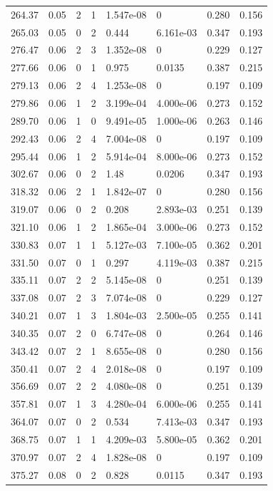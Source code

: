 \documentclass[preview]{standalone}
\begin{document}
{{{\begin{tabular}{L{1.2cm}C{1.2cm} C{0.3cm}C{0.5cm} C{1.4cm}C{1.4cm} C{1.4cm}C{1.4cm}}
  264.37  &  0.05  & 2     &  1 &  1.547e-08  & 0  & 0.280 &  0.156   \\ 
  265.03  &  0.05  & 0     &  2 &  0.444  & 6.161e-03  & 0.347 &  0.193   \\ 
  276.47  &  0.06  & 2     &  3 &  1.352e-08  & 0  & 0.229 &  0.127   \\ 
  277.66  &  0.06  & 0     &  1 &  0.975  & 0.0135  & 0.387 &  0.215   \\ 
  279.13  &  0.06  & 2     &  4 &  1.253e-08  & 0  & 0.197 &  0.109   \\ 
  279.86  &  0.06  & 1     &  2 &  3.199e-04  & 4.000e-06  & 0.273 &  0.152   \\ 
  289.70  &  0.06  & 1     &  0 &  9.491e-05  & 1.000e-06  & 0.263 &  0.146   \\ 
  292.43  &  0.06  & 2     &  4 &  7.004e-08  & 0  & 0.197 &  0.109   \\ 
  295.44  &  0.06  & 1     &  2 &  5.914e-04  & 8.000e-06  & 0.273 &  0.152   \\ 
  302.67  &  0.06  & 0     &  2 &  1.48  & 0.0206  & 0.347 &  0.193   \\ 
  318.32  &  0.06  & 2     &  1 &  1.842e-07  & 0  & 0.280 &  0.156   \\ 
  319.07  &  0.06  & 0     &  2 &  0.208  & 2.893e-03  & 0.251 &  0.139   \\ 
  321.10  &  0.06  & 1     &  2 &  1.865e-04  & 3.000e-06  & 0.273 &  0.152   \\ 
  330.83  &  0.07  & 1     &  1 &  5.127e-03  & 7.100e-05  & 0.362 &  0.201   \\ 
  331.50  &  0.07  & 0     &  1 &  0.297  & 4.119e-03  & 0.387 &  0.215   \\ 
  335.11  &  0.07  & 2     &  2 &  5.145e-08  & 0  & 0.251 &  0.139   \\ 
  337.08  &  0.07  & 2     &  3 &  7.074e-08  & 0  & 0.229 &  0.127   \\ 
  340.21  &  0.07  & 1     &  3 &  1.804e-03  & 2.500e-05  & 0.255 &  0.141   \\ 
  340.35  &  0.07  & 2     &  0 &  6.747e-08  & 0  & 0.264 &  0.146   \\ 
  343.42  &  0.07  & 2     &  1 &  8.655e-08  & 0  & 0.280 &  0.156   \\ 
  350.41  &  0.07  & 2     &  4 &  2.018e-08  & 0  & 0.197 &  0.109   \\ 
  356.69  &  0.07  & 2     &  2 &  4.080e-08  & 0  & 0.251 &  0.139   \\ 
  357.81  &  0.07  & 1     &  3 &  4.280e-04  & 6.000e-06  & 0.255 &  0.141   \\ 
  364.07  &  0.07  & 0     &  2 &  0.534  & 7.413e-03  & 0.347 &  0.193   \\ 
  368.75  &  0.07  & 1     &  1 &  4.209e-03  & 5.800e-05  & 0.362 &  0.201   \\ 
  370.97  &  0.07  & 2     &  4 &  1.828e-08  & 0  & 0.197 &  0.109   \\ 
  375.27  &  0.08  & 0     &  2 &  0.828  & 0.0115  & 0.347 &  0.193   \\ 
\hline 
\end{tabular} 

}}}
\end{document}
